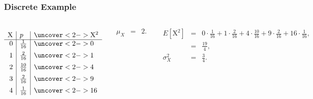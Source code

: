 \begin{frame}
  \frametitle{Discrete Example}


   \begin{columns}
     \begin{eqnarray*}
       \begin{array}{r|l|l}
         \mathrm{X} & p & \uncover<2->{\mathrm{X}^2} \\ \hline
          0 & \frac{1}{16} & \uncover<2->{0}  \\ [5pt]
          1 & \frac{2}{16} & \uncover<2->{1} \\ [5pt]
          2 & \frac{10}{16}& \uncover<2->{4} \\ [5pt]
          3 & \frac{2}{16} & \uncover<2->{9} \\ [5pt]
          4 & \frac{1}{16} & \uncover<2->{16}
       \end{array}
     \end{eqnarray*}

       \begin{eqnarray*}
         \mu_X & = & 2.
       \end{eqnarray*}

     {
       \begin{eqnarray*}
         E\left[\mathrm{X}^2\right] & = & 0 \cdot \frac{1}{16} + 1 \cdot \frac{2}{16} + 4 \cdot \frac{10}{16} + 9 \cdot \frac{2}{16} + 16 \cdot \frac{1}{16}, \\
         & = & \frac{19}{4}, \\
         \sigma^2_X & = & \frac{3}{4}.
       \end{eqnarray*}
     }

   \end{columns}

  
\end{frame}


